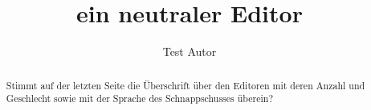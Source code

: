 \documentclass{snapshotmfo}
\author{Test Autor}
\title{ein neutraler Editor}
\begin{document}
\begin{abstract}
Stimmt auf der letzten Seite die Überschrift über den Editoren mit deren Anzahl und Geschlecht sowie mit 
der Sprache des Schnappschusses überein?
\end{abstract}
\end{document}
